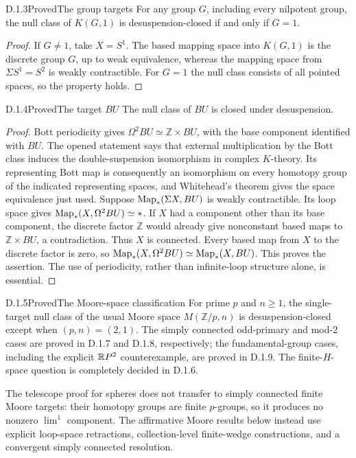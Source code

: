\begin{claim}{D.1.3}{Proved}{The group targets}
For any group $G$, including every nilpotent group, the null class of $K(G,1)$ is desuspension-closed if and only if $G=1$.
\end{claim}
\begin{proof}
If $G\neq1$, take $X=S^1$. The based mapping space into $K(G,1)$ is the discrete group $G$, up to weak equivalence, whereas the mapping space from $\Sigma S^1=S^2$ is weakly contractible. For $G=1$ the null class consists of all pointed spaces, so the property holds.
\end{proof}

\begin{claim}{D.1.4}{Proved}{The target $BU$}
The null class of $BU$ is closed under desuspension.
\end{claim}
\begin{proof}
Bott periodicity gives $\Omega^2BU\simeq\mathbb Z\times BU$, with the base component identified with $BU$. The opened statement \cite[Theorem 2.11]{HatcherVB} says that external multiplication by the Bott class induces the double-suspension isomorphism in complex $K$-theory. Its representing Bott map is consequently an isomorphism on every homotopy group of the indicated representing spaces, and Whitehead's theorem gives the space equivalence just used. Suppose $\operatorname{Map}_*(\Sigma X,BU)$ is weakly contractible. Its loop space gives $\operatorname{Map}_*(X,\Omega^2BU)\simeq *$. If $X$ had a component other than its base component, the discrete factor $\mathbb Z$ would already give nonconstant based maps to $\mathbb Z\times BU$, a contradiction. Thus $X$ is connected. Every based map from $X$ to the discrete factor is zero, so $\operatorname{Map}_*(X,\Omega^2BU)\simeq\operatorname{Map}_*(X,BU)$. This proves the assertion. The use of periodicity, rather than infinite-loop structure alone, is essential.
\end{proof}

\begin{claim}{D.1.5}{Proved}{The Moore-space classification}
For prime $p$ and $n\geq1$, the single-target null class of the usual Moore space $M(\mathbb Z/p,n)$ is desuspension-closed except when $(p,n)=(2,1)$. The simply connected odd-primary and mod-$2$ cases are proved in D.1.7 and D.1.8, respectively; the fundamental-group cases, including the explicit $\mathbb{R}P^2$ counterexample, are proved in D.1.9. The finite-$H$-space question is completely decided in D.1.6.
\end{claim}
The telescope proof for spheres does not transfer to simply connected finite Moore targets: their homotopy groups are finite $p$-groups, so it produces no nonzero $\lim^1$ component. The affirmative Moore results below instead use explicit loop-space retractions, collection-level finite-wedge constructions, and a convergent simply connected resolution.


